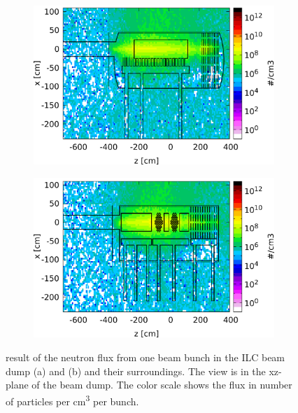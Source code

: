 \begin{figure}[!h]
 \centering
  \begin{subfigure}[b]{0.49\textwidth}
   \centering
    \includegraphics[width=\textwidth]{Figures/BeamDump/Neutron_flux_xz_Design1.png}
   \caption{\designone}
   \end{subfigure}
   \hfill
    \begin{subfigure}[b]{0.49\textwidth}
   \centering
    \includegraphics[width=\textwidth]{Figures/BeamDump/Neutron_flux_xz_Design2.png}
   \caption{\designtwo}
   \end{subfigure}
   \caption[Neutron flux in the ILC main beam dump]{\fluka result of the neutron flux from one beam bunch in the ILC beam dump \designone (a) and \designtwo (b) and their surroundings.
   The view is in the xz-plane of the beam dump.
   The color scale shows the flux in number of particles per \si[detect-all]{\centi\meter\cubed} per bunch.}
   \label{fig:BeamDumps:Neutrons}
\end{figure} 
